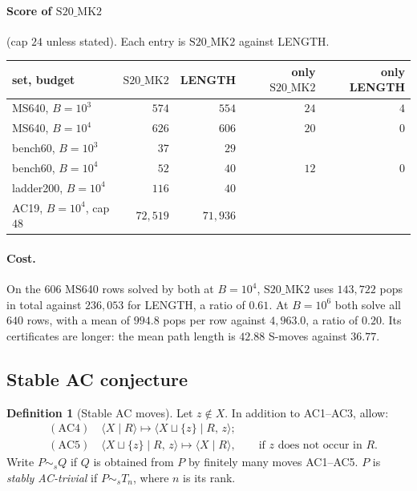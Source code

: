 \documentclass[11pt]{article}
\theoremstyle{definition}
\newtheorem{definition}[theorem]{Definition}
\theoremstyle{remark}
\newcommand{\pres}[2]{\langle #1 \mid #2 \rangle}
\newcommand{\SMK}{\mathrm{S20\_MK2}}
\begin{document}
\paragraph{Score of $\SMK$} (cap $24$ unless stated). Each entry is $\SMK$ against LENGTH.
\begin{center}
\begin{tabular}{lrrrr}
\toprule
set, budget & $\SMK$ & LENGTH & only $\SMK$ & only LENGTH\\
\midrule
MS640, $B=10^3$ & $574$ & $554$ & $24$ & $4$\\
MS640, $B=10^4$ & $626$ & $606$ & $20$ & $0$\\
bench60, $B=10^3$ & $37$ & $29$ & & \\
bench60, $B=10^4$ & $52$ & $40$ & $12$ & $0$\\
ladder200, $B=10^4$ & $116$ & $40$ & & \\
AC19, $B=10^4$, cap $48$ & $72{,}519$ & $71{,}936$ & & \\
\bottomrule
\end{tabular}
\end{center}

\paragraph{Cost.} On the $606$ MS640 rows solved by both at $B=10^4$, $\SMK$ uses $143{,}722$ pops in total against
$236{,}053$ for LENGTH, a ratio of $0.61$. At $B=10^6$ both solve all $640$ rows, with a mean of $994.8$ pops per row
against $4{,}963.0$, a ratio of $0.20$. Its certificates are longer: the mean path length is $42.88$ S-moves against
$36.77$.

\subsection{Stable AC conjecture}

\begin{definition}[Stable AC moves]
Let $z\notin X$. In addition to AC1--AC3, allow:
\begin{align*}
&(\mathrm{AC4})\quad \pres{X}{R}\mapsto\pres{X\sqcup\{z\}}{R,\,z};\\
&(\mathrm{AC5})\quad \pres{X\sqcup\{z\}}{R,\,z}\mapsto\pres{X}{R},\qquad \text{if } z \text{ does not occur in } R.
\end{align*}
Write $P\sim_sQ$ if $Q$ is obtained from $P$ by finitely many moves AC1--AC5. $P$ is \emph{stably AC-trivial} if
$P\sim_s T_n$, where $n$ is its rank.
\end{definition}
\end{document}
